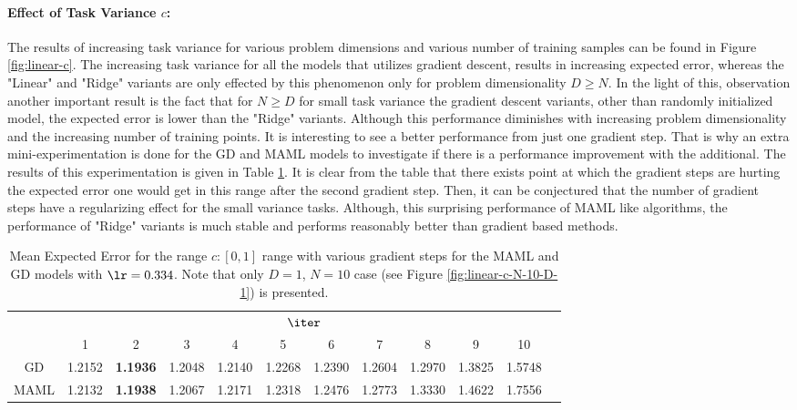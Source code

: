 \paragraph{Effect of Task Variance $c$:} The results of increasing task variance for various problem dimensions and various number of training samples can be found in Figure \ref{fig:linear-c}. The increasing task variance for all the models that utilizes gradient descent, results in increasing expected error, whereas the "Linear" and "Ridge" variants are only effected by this phenomenon only for problem dimensionality $D\geq N$. In the light of this, observation another important result is the fact that for $N\geq D$  for small task variance the gradient descent variants, other than randomly initialized model, the expected error is lower than the "Ridge" variants. Although this performance diminishes with increasing problem dimensionality and the increasing number of training points. It is interesting to see a better performance from just one gradient step. That is why an extra mini-experimentation is done for the GD and MAML models to investigate if there is a performance improvement with the additional. The results of this experimentation is given in Table \ref{tab:zoom}. It is clear from the table that there exists point at which the gradient steps are hurting the expected error one would get in this range after the second gradient step. Then, it can be conjectured that the number of gradient steps have a regularizing effect for the small variance tasks. Although, this surprising performance of MAML like algorithms, the performance of "Ridge" variants is much stable and performs reasonably better than gradient based methods. 

\begin{table}
  \centering
  \caption{Mean Expected Error for the range $c:[0,1]$ range with various gradient steps for the MAML and GD models with $\lr=0.334$. Note that only $D=1$, $N=10$ case (see Figure \ref{fig:linear-c-N-10-D-1}) is presented.}\label{tab:zoom}
  \begin{tabular}{c|c|c|c|c|c|c|c|c|c|c|c|}
    \cline{2-11}
     & \multicolumn{10}{|c|}{$\iter$}\\
    \cline{2-11}
     & 1 & 2 & 3 & 4 & 5 & 6 & 7 & 8 & 9 & 10\\
    \hline
    \multicolumn{1}{|c|}{GD} & 1.2152 &  \textbf{1.1936} & 1.2048 & 1.2140 &  1.2268 & 1.2390 & 1.2604 & 1.2970 &1.3825 & 1.5748\\
    \hline
    \multicolumn{1}{|c|}{MAML} & 1.2132 & \textbf{1.1938} & 1.2067 & 1.2171 & 1.2318 & 1.2476 & 1.2773 & 1.3330 & 1.4622 & 1.7556  \\
    \hline
    \end{tabular}
\end{table}

